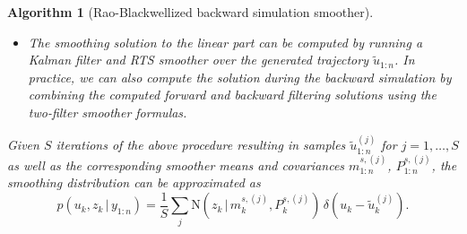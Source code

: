 \documentclass[twocolumn]{autart}    %
\newtheorem{algo}{Algorithm}[section]
\begin{document}
\begin{algo}[Rao-Blackwellized backward simulation smoother]
\begin{itemize}
\begin{enumerate}
  \item Choose $\tilde{u}_k = u_k^{(i)}$ with probability
    $w^{(i)}_{k|k+1}$.
  \end{enumerate}
\item The smoothing solution to the linear part can be computed by
  running a Kalman filter and RTS smoother over the generated
  trajectory $\tilde{u}_{1:n}$. In practice, we can also compute the
  solution during the backward simulation by combining
  the computed forward and backward filtering solutions using
  the two-filter smoother formulas.
\end{itemize}
%
Given $S$ iterations of the above procedure resulting in samples
$\tilde{u}_{1:n}^{(j)}$ for $j=1,\ldots,S$ as well as the
corresponding smoother means and covariances $m^{s,(j)}_{1:n}$,
$P^{s,(j)}_{1:n}$, the smoothing distribution can be approximated
as
%
\begin{equation}
  p(u_k,z_k\,|\,y_{1:n})
  = \frac{1}{S} \sum_j \mathrm{N}(z_k\,|\,m_k^{s,(j)},P_k^{s,(j)}) \,
  \delta(u_k - \tilde{u}_k^{(j)}).
\nonumber
\end{equation}
\end{algo}
\end{document}
